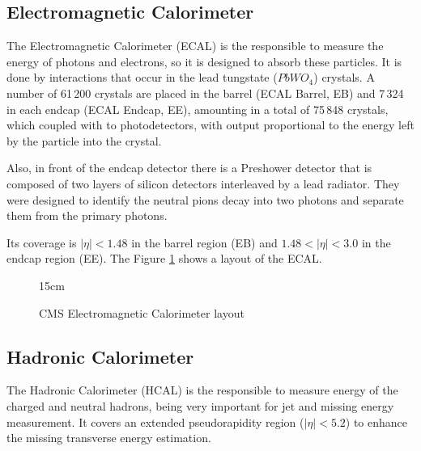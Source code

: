 \subsection{Electromagnetic Calorimeter}

The Electromagnetic Calorimeter (ECAL) is the responsible to measure the energy of photons and electrons, so it is designed to absorb these particles. It is done by interactions that occur in the lead tungstate ($PbWO_4$) crystals. A number of 61\,200 crystals are placed in the barrel (ECAL Barrel, EB) and 7\,324 in each endcap (ECAL Endcap, EE), amounting in a total of 75\,848 crystals, which coupled with to photodetectors, with output proportional to the energy left by the particle into the crystal. 

Also, in front of the endcap detector there is a Preshower detector that is composed of two layers of silicon detectors interleaved by a lead radiator. They were designed to identify the neutral pions decay into two photons and separate them from the primary photons.

Its coverage is $|\eta| < 1.48$ in the barrel region (EB) and  $1.48 < |\eta| < 3.0$ in the endcap region (EE). The Figure \ref{fig:ecal_layout} shows a layout of the ECAL.

\begin{figure}[!htm]{15cm} 
\caption{CMS Electromagnetic Calorimeter layout}%
\label{fig:ecal_layout}
\end{figure}

\subsection{Hadronic Calorimeter}

The Hadronic Calorimeter (HCAL) is the responsible to measure energy of the charged and neutral hadrons, being very important for jet and missing energy measurement. It covers an extended pseudorapidity region ($|\eta| < 5.2$) to enhance the missing transverse energy estimation.

